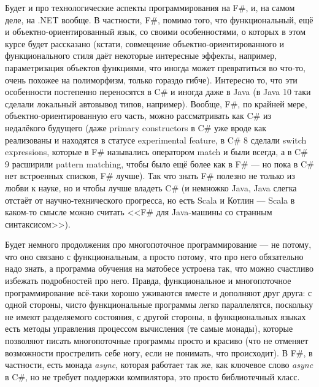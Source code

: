 \documentclass[a5paper]{article}
\begin{document}
Будет и про технологические аспекты программирования на F\#, и, на самом деле, на .NET вообще. В частности, F\#, помимо того, что функциональный, ещё и объектно-ориентированный язык, со своими особенностями, о которых в этом курсе будет рассказано (кстати, совмещение объектно-ориентированного и функционального стиля даёт некоторые интересные эффекты, например, параметризация объектов функциями, что иногда может превратиться во что-то, очень похожее на полиморфизм, только гораздо гибче). Интересно то, что эти особенности постепенно переносятся в C\# и иногда даже в Java (в Java 10 таки сделали локальный автовывод типов, например). Вообще, F\#, по крайней мере, объектно-ориентированную его часть, можно рассматривать как C\# из недалёкого будущего (даже primary constructors в C\# уже вроде как реализованы и находятся в статусе experimental feature, в C\# 8 сделали switch expressions, которые в F\# назывались оператором match и были всегда, а в C\# 9 расширили pattern matching, чтобы было ещё более как в F\# --- но пока в C\# нет встроенных списков, F\# лучше). Так что знать F\# полезно не только из любви к науке, но и чтобы лучше владеть C\# (и немножко Java, Java слегка отстаёт от научно-технического прогресса, но есть Scala и Котлин --- Scala в каком-то смысле можно считать <<F\# для Java-машины со странным синтаксисом>>).

Будет немного продолжения про многопоточное программирование --- не потому, что оно связано с функциональным, а просто потому, что про него обязательно надо знать, а программа обучения на матобесе устроена так, что можно счастливо избежать подробностей про него. Правда, функциональное и многопоточное программирование всё-таки хорошо уживаются вместе и дополняют друг друга: с одной стороны, чисто функциональные программы легко параллелятся, поскольку не имеют разделяемого состояния, с другой стороны, в функциональных языках есть методы управления процессом вычисления (те самые монады), которые позволяют писать многопоточные программы просто и красиво (что не отменяет возможности прострелить себе ногу, если не понимать, что происходит). В F\#, в частности, есть монада \textit{async}, которая работает так же, как ключевое слово \textit{async} в C\#, но не требует поддержки компилятора, это просто библиотечный класс.
\end{document}
